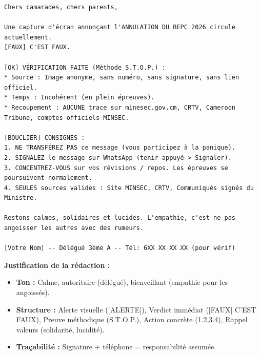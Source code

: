 \documentclass[11pt]{article}
\begin{document}
\begin{exoresolu}
\begin{lstlisting}[language=text]
Chers camarades, chers parents,

Une capture d'écran annonçant l'ANNULATION DU BEPC 2026 circule actuellement.
[FAUX] C'EST FAUX.

[OK] VÉRIFICATION FAITE (Méthode S.T.O.P.) :
* Source : Image anonyme, sans numéro, sans signature, sans lien officiel.
* Temps : Incohérent (en plein épreuves).
* Recoupement : AUCUNE trace sur minesec.gov.cm, CRTV, Cameroon Tribune, comptes officiels MINSEC.

[BOUCLIER] CONSIGNES :
1. NE TRANSFÉREZ PAS ce message (vous participez à la panique).
2. SIGNALEZ le message sur WhatsApp (tenir appuyé > Signaler).
3. CONCENTREZ-VOUS sur vos révisions / repos. Les épreuves se poursuivent normalement.
4. SEULES sources valides : Site MINSEC, CRTV, Communiqués signés du Ministre.

Restons calmes, solidaires et lucides. L'empathie, c'est ne pas angoisser les autres avec des rumeurs.

[Votre Nom] -- Délégué 3ème A -- Tél: 6XX XX XX XX (pour vérif)
\end{lstlisting}

\textbf{Justification de la rédaction :}
\begin{itemize}
    \item \textbf{Ton :} Calme, autoritaire (délégué), bienveillant (empathie pour les angoissés).
    \item \textbf{Structure :} Alerte visuelle ([ALERTE]), Verdict immédiat ([FAUX] C'EST FAUX), Preuve méthodique (S.T.O.P.), Action concrète (1.2,3.4), Rappel valeurs (solidarité, lucidité).
    \item \textbf{Traçabilité :} Signature + téléphone = responsabilité assumée.
\end{itemize}
\end{exoresolu}
\end{document}
